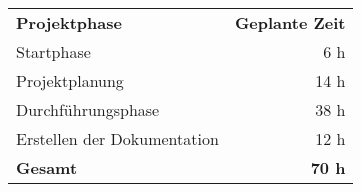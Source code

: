 \begin{tabular}{lr}
\rowcolor{heading}\textbf{Projektphase} & \textbf{Geplante Zeit} \\
Startphase & 6 h \\
\rowcolor{odd}Projektplanung & 14 h \\
Durchführungsphase & 38 h \\
\rowcolor{odd}Erstellen der Dokumentation & 12 h \\
\hline
\rowcolor{odd}\textbf{Gesamt} & \textbf{70 h} \\
\end{tabular}
